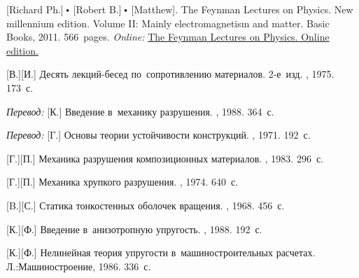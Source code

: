\begin{thebibliography}{123}
\begin{otherlanguage}{russian}

[Richard Ph.] ${\hspace{-0.2ex}\bigdot}$ [Robert B.] ${\hspace{-0.2ex}\bigdot}$ [Matthew]. The Feynman Lectures on Physics. New millennium edition. Volume II: Mainly electromagnetism and matter. Basic Books, 2011. 566~pages.
\emph{Online:}
\href{http://www.feynmanlectures.caltech.edu/}{The Feynman Lectures on Physics. Online edition.}

[В.][И.] Десять лекций\hbox{-}бесед по~сопротивлению материалов. 2\hbox{-}е~изд. \naukapublisher, 1975. 173~с.

\emph{Перевод:} [К.] Введение в~механику разрушения. \mirpublisher, 1988. 364~с.

\emph{Перевод:} [Г.] Основы теории устойчивости конструкций. \mirpublisher, 1971. 192~с.

[Г.][П.] Механика разрушения композиционных материалов. \naukapublisher, 1983. 296~с.

[Г.][П.] Механика хрупкого разрушения. \naukapublisher, 1974. 640~с.

[B.][С.] Статика тонкостенных оболочек вращения. \naukapublisher, 1968. 456~с.

[К.][Ф.] Введение в~анизотропную упругость. \naukapublisher, 1988. 192~с.

[К.][Ф.] Нелинейная теория упругости в~машиностроительных расчетах. Л.:\;Машино\-строение, 1986. 336~с.


\end{otherlanguage}
\end{thebibliography}
